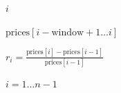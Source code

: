 \documentclass{article}
\begin{document}
$i$
\pagebreak

$\text{prices}[i-\text{window}+1 \ldots i]$
\pagebreak

$r_i = \frac{\text{prices}[i] - \text{prices}[i-1]}
{\text{prices}[i-1]}$
\pagebreak

$i = 1 \ldots n-1$
\pagebreak
\end{document}
